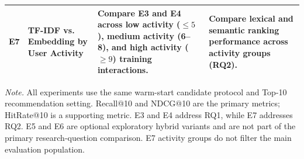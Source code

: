 \begin{table}[t]
\begin{tabular}{p{0.55cm} p{2.55cm} p{7.0cm} p{5.6cm}}
E7 & TF-IDF vs. Embedding by User Activity &
Compare E3 and E4 across low activity ($\leq 5$), medium activity (6--8), and high activity ($\geq 9$) training interactions. &
Compare lexical and semantic ranking performance across activity groups (RQ2). \\

\bottomrule
\end{tabular}

\vspace{2pt}
\begin{minipage}{\textwidth}
\footnotesize
\textit{Note.} All experiments use the same warm-start candidate protocol and Top-10 recommendation setting. Recall@10 and NDCG@10 are the primary metrics; HitRate@10 is a supporting metric. E3 and E4 address RQ1, while E7 addresses RQ2. E5 and E6 are optional exploratory hybrid variants and are not part of the primary research-question comparison. E7 activity groups do not filter the main evaluation population.
\end{minipage}
\end{table}
